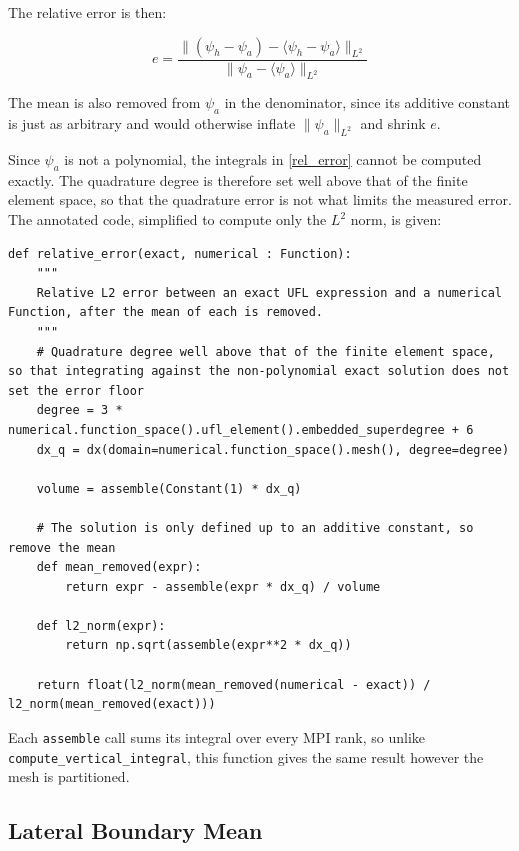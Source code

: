 \documentclass{article}
\begin{document}
\begin{appendices}
The relative error is then:

\begin{equation}\label{rel_error}
    e = \frac{\lVert (\psi_h - \psi_a) - \langle \psi_h - \psi_a \rangle \rVert_{L^2}}{\lVert \psi_a - \langle \psi_a \rangle \rVert_{L^2}}
\end{equation}

The mean is also removed from $\psi_a$ in the denominator, since its additive constant is just as arbitrary and would otherwise inflate $\lVert \psi_a \rVert_{L^2}$ and shrink $e$.

Since $\psi_a$ is not a polynomial, the integrals in \cref{rel_error} cannot be computed exactly.
The quadrature degree is therefore set well above that of the finite element space, so that the quadrature error is not what limits the measured error.
The annotated code, simplified to compute only the $L^2$ norm, is given:

\begin{verbatim}
def relative_error(exact, numerical : Function):
    """
    Relative L2 error between an exact UFL expression and a numerical Function, after the mean of each is removed.
    """
    # Quadrature degree well above that of the finite element space, so that integrating against the non-polynomial exact solution does not set the error floor
    degree = 3 * numerical.function_space().ufl_element().embedded_superdegree + 6
    dx_q = dx(domain=numerical.function_space().mesh(), degree=degree)

    volume = assemble(Constant(1) * dx_q)

    # The solution is only defined up to an additive constant, so remove the mean
    def mean_removed(expr):
        return expr - assemble(expr * dx_q) / volume

    def l2_norm(expr):
        return np.sqrt(assemble(expr**2 * dx_q))

    return float(l2_norm(mean_removed(numerical - exact)) / l2_norm(mean_removed(exact)))
\end{verbatim}

Each \texttt{assemble} call sums its integral over every MPI rank, so unlike \texttt{compute_vertical_integral}, this function gives the same result however the mesh is partitioned.

\subsection{Lateral Boundary Mean}\label{app:psi_0}


\end{appendices}
\end{document}
